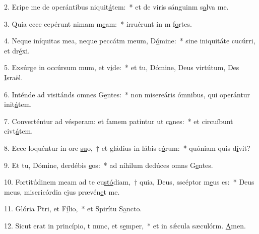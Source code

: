 2. Eripe me de operántibus niquit\uline{á}tem:~* et de viris sánguinm s\uline{a}lva me.\par 
3. Quia ecce cepérunt nimam m\uline{e}am:~* irruérunt in m f\uline{o}rtes.\par 
4. Neque iníquitas mea, neque peccátm meum, D\uline{ó}mine:~* sine iniquitáte cucúrri, et dr\uline{é}xi.\par 
5. Exsúrge in occúrsum mum, et v\uline{i}de:~* et tu, Dómine, Deus virtútum, Des \uline{I}sraël.\par 
6. Inténde ad visitánds omnes G\uline{e}ntes:~* non misereáris ómnibus, qui operántur init\uline{á}tem.\par 
7. Converténtur ad vésperam: et famem patintur ut c\uline{a}nes:~* et circuíbunt civt\uline{á}tem.\par 
8. Ecce loquéntur in ore \uline{su}o,~† et gládius in lábis e\uline{ó}rum:~* quóniam quis d\uline{í}vit?\par 
9. Et tu, Dómine, derdébis \uline{e}os:~* ad níhilum dedúces omns G\uline{e}ntes.\par 
10. Fortitúdinem meam ad te cu\uline{stó}diam,~† quia, Deus, sscéptor m\uline{e}us es:~* Deus meus, misericórdia ejus prævén\uline{e}t me.\par 
11. Glória Ptri, et F\uline{í}lio,~* et Spirítu S\uline{a}ncto.\par 
12. Sicut erat in princípio, t nunc, et s\uline{e}mper,~* et in sǽcula sæculórm. \uline{A}men.\par 
